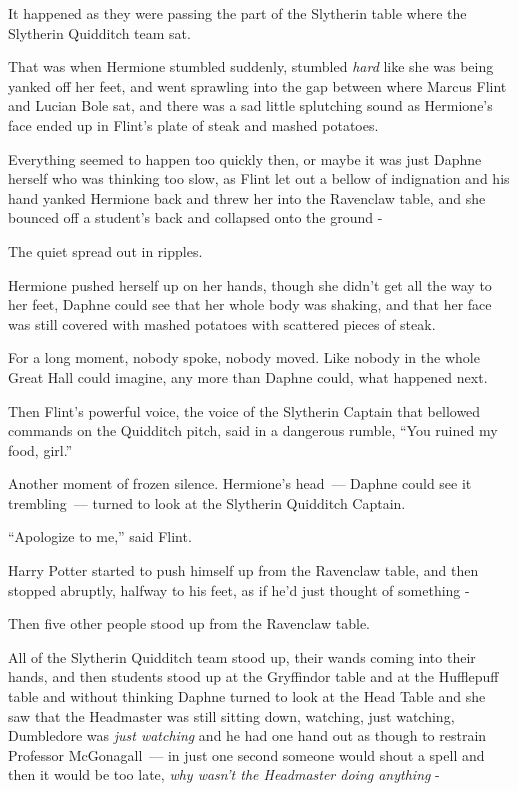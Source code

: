 It happened as they were passing the part of the Slytherin table where the Slytherin Quidditch team sat.

That was when Hermione stumbled suddenly, stumbled \emph{hard} like she was being yanked off her feet, and went sprawling into the gap between where Marcus Flint and Lucian Bole sat, and there was a sad little splutching sound as Hermione's face ended up in Flint's plate of steak and mashed potatoes.

Everything seemed to happen too quickly then, or maybe it was just Daphne herself who was thinking too slow, as Flint let out a bellow of indignation and his hand yanked Hermione back and threw her into the Ravenclaw table, and she bounced off a student's back and collapsed onto the ground -

The quiet spread out in ripples.

Hermione pushed herself up on her hands, though she didn't get all the way to her feet, Daphne could see that her whole body was shaking, and that her face was still covered with mashed potatoes with scattered pieces of steak.

For a long moment, nobody spoke, nobody moved. Like nobody in the whole Great Hall could imagine, any more than Daphne could, what happened next.

Then Flint's powerful voice, the voice of the Slytherin Captain that bellowed commands on the Quidditch pitch, said in a dangerous rumble, ``You ruined my food, girl.''

Another moment of frozen silence. Hermione's head~--- Daphne could see it trembling~--- turned to look at the Slytherin Quidditch Captain.

``Apologize to me,'' said Flint.

Harry Potter started to push himself up from the Ravenclaw table, and then stopped abruptly, halfway to his feet, as if he'd just thought of something -

Then five other people stood up from the Ravenclaw table.

All of the Slytherin Quidditch team stood up, their wands coming into their hands, and then students stood up at the Gryffindor table and at the Hufflepuff table and without thinking Daphne turned to look at the Head Table and she saw that the Headmaster was still sitting down, watching, just watching, Dumbledore was \emph{just watching} and he had one hand out as though to restrain Professor McGonagall~--- in just one second someone would shout a spell and then it would be too late, \emph{why wasn't the Headmaster doing anything} -

